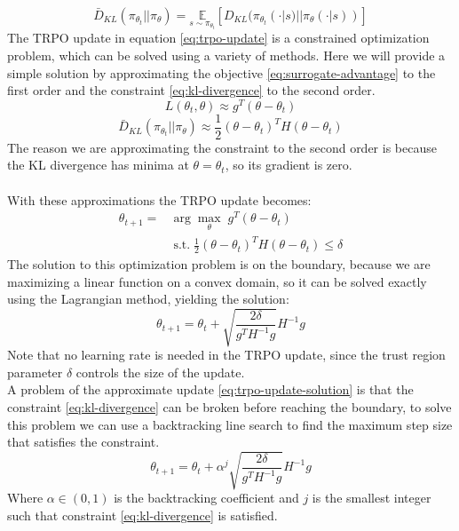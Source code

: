 \begin{equation}
    \bar D_{KL}(\pi_{\theta_t} || \pi_{\theta}) = \underset{s \sim \pi_{\theta_t}}{\mathbb{E}} \left[ D_{KL}(\pi_{\theta_t}(\cdot|s) || \pi_{\theta}(\cdot|s)) \right]
    \label{eq:kl-divergence}
\end{equation}
The TRPO update in equation \eqref{eq:trpo-update} is a constrained optimization problem, which can be solved using a variety of methods. Here we will provide a simple solution by approximating the objective \eqref{eq:surrogate-advantage} to the first order and the constraint \eqref{eq:kl-divergence} to the second order.\\
\begin{equation}
    L(\theta_t, \theta) \approx g^T (\theta - \theta_t)
\end{equation}
\begin{equation}
    \bar D_{KL}(\pi_{\theta_t} || \pi_{\theta}) \approx \frac{1}{2} (\theta - \theta_t)^T H (\theta - \theta_t)
\end{equation}
The reason we are approximating the constraint to the second order is because the KL divergence has minima at $\theta = \theta_t$, so its gradient is zero.\\\\
With these approximations the TRPO update becomes:
\begin{equation}
    \begin{split}
        \theta_{t+1} = & \arg\max_{\theta} \; g^T (\theta - \theta_t)\\
        & \; \text{s.t.} \; \frac{1}{2} (\theta - \theta_t)^T H (\theta - \theta_t) \leq \delta
    \end{split}
    \label{eq:trpo-update-approx}
\end{equation}
The solution to this optimization problem is on the boundary, because we are maximizing a linear function on a convex domain, so it can be solved exactly using the Lagrangian method, yielding the solution:
\begin{equation}
    \theta_{t+1} = \theta_t + \sqrt{\frac{2\delta}{g^T H^{-1} g}} H^{-1} g
    \label{eq:trpo-update-solution}
\end{equation}
Note that no learning rate is needed in the TRPO update, since the trust region parameter $\delta$ controls the size of the update.\\
A problem of the approximate update \eqref{eq:trpo-update-solution} is that the constraint \eqref{eq:kl-divergence} can be broken before reaching the boundary, to solve this problem we can use a backtracking line search to find the maximum step size that satisfies the constraint.\\
\begin{equation}
    \theta_{t+1} = \theta_t + \alpha^j \sqrt{\frac{2\delta}{g^T H^{-1} g}} H^{-1} g
    \label{eq:trpo-update-line-search}
\end{equation}
Where $\alpha \in (0, 1)$ is the backtracking coefficient and $j$ is the smallest integer such that constraint \eqref{eq:kl-divergence} is satisfied.\\

